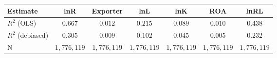 \begin{tabular}{l*{6}{c}}
\hline\hline
 Estimate & lnR & Exporter & lnL & lnK & ROA & lnRL \\
\hline
\addlinespace $ R^2$ (OLS) & $0.667$ & $0.012$ & $0.215$ & $0.089$ & $0.010$ & $0.438$ \\
$ R^2$ (debiased) & $0.305$ & $0.009$ & $0.102$ & $0.045$ & $0.005$ & $0.232$ \\
N & $1,776,119$ & $1,776,119$ & $1,776,119$ & $1,776,119$ & $1,776,119$ & $1,776,119$ \\
\hline\hline
\end{tabular}

